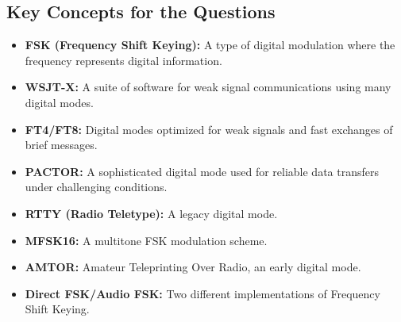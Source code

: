 
\subsection*{Key Concepts for the Questions}
\begin{itemize}
      \item \textbf{FSK (Frequency Shift Keying):} A type of digital modulation where the frequency represents digital information.
        \item \textbf{WSJT-X:} A suite of software for weak signal communications using many digital modes.
      \item \textbf{FT4/FT8:} Digital modes optimized for weak signals and fast exchanges of brief messages.
      \item \textbf{PACTOR:} A sophisticated digital mode used for reliable data transfers under challenging conditions.
       \item  \textbf{RTTY (Radio Teletype):} A legacy digital mode.
    \item \textbf{MFSK16:} A multitone FSK modulation scheme.
    \item \textbf{AMTOR:} Amateur Teleprinting Over Radio, an early digital mode.
   \item \textbf{Direct FSK/Audio FSK:} Two different implementations of Frequency Shift Keying.
    
\end{itemize}

